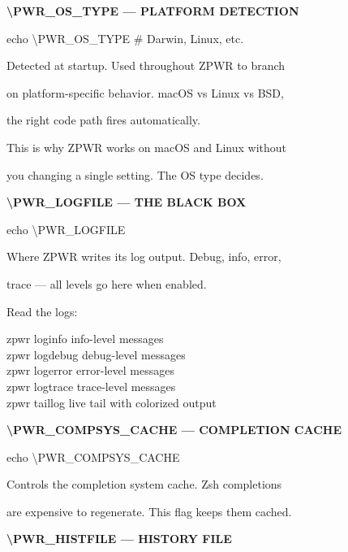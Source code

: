 \documentclass[11pt,a4paper,twoside]{book}
\begin{document}
\vspace{12pt}
{\bfseries\color{neonyellow} \textbackslash{}PWR\_OS\_TYPE — PLATFORM DETECTION}\vspace{4pt}

echo \textbackslash{}PWR\_OS\_TYPE   \# Darwin, Linux, etc.

Detected at startup. Used throughout ZPWR to branch

on platform-specific behavior. macOS vs Linux vs BSD,

the right code path fires automatically.

This is why ZPWR works on macOS and Linux without

you changing a single setting. The OS type decides.


\vspace{12pt}
{\bfseries\color{neonyellow} \textbackslash{}PWR\_LOGFILE — THE BLACK BOX}\vspace{4pt}

echo \textbackslash{}PWR\_LOGFILE

Where ZPWR writes its log output. Debug, info, error,

trace — all levels go here when enabled.

Read the logs:

\begin{codebox}
zpwr loginfo         info-level messages\\
zpwr logdebug        debug-level messages\\
zpwr logerror        error-level messages\\
zpwr logtrace        trace-level messages\\
zpwr taillog         live tail with colorized output\\
\end{codebox}


\vspace{12pt}
{\bfseries\color{neonyellow} \textbackslash{}PWR\_COMPSYS\_CACHE — COMPLETION CACHE}\vspace{4pt}

echo \textbackslash{}PWR\_COMPSYS\_CACHE

Controls the completion system cache. Zsh completions

are expensive to regenerate. This flag keeps them cached.


\vspace{12pt}
{\bfseries\color{neonyellow} \textbackslash{}PWR\_HISTFILE — HISTORY FILE}\vspace{4pt}
\end{document}
